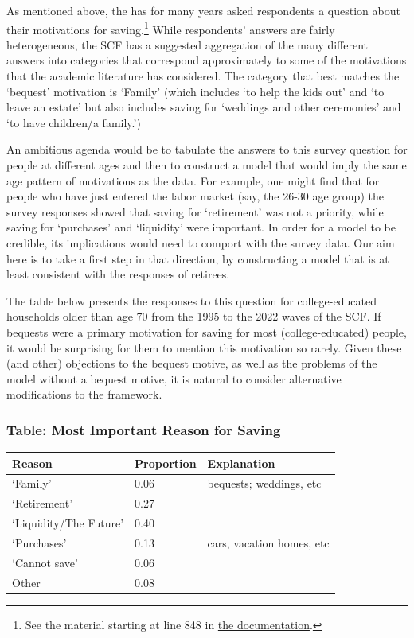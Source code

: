 \documentclass{article}
\begin{document}
As mentioned above, the \cite{2023} has for many years asked respondents a question about their motivations for saving.\footnote{See the material starting at line 848 in \href{https://www.federalreserve.gov/econres/files/bulletin.macro.txt}{the documentation}.}
While respondents' answers are fairly heterogeneous, the SCF has a suggested aggregation of the many different answers into categories that correspond approximately to some of the motivations that the academic literature has considered.
The category that best matches the `bequest' motivation is `Family' (which includes `to help the kids out' and `to leave an estate' but also includes saving for `weddings and other ceremonies' and `to have children/a family.')

An ambitious agenda would be to tabulate the answers to this survey question for people at different ages and then to construct a model that would imply the same age pattern of motivations as the data.
For example, one might find that for people who have just entered the labor market (say, the 26-30 age group) the survey responses showed that saving for `retirement' was not a priority, while saving for `purchases' and `liquidity' were important.
In order for a model to be credible, its implications would need to comport with the survey data.
Our aim here is to take a first step in that direction, by constructing a model that is at least consistent with the responses of retirees.

The table below presents the responses to this question for college-educated households older than age 70 from the 1995 to the 2022 waves of the SCF.
If bequests were a primary motivation for saving for most (college-educated) people, it would be surprising for them to mention this motivation so rarely.
Given these (and other) objections to the bequest motive, as well as the problems of the model without a bequest motive, it is natural to consider alternative modifications to the framework.

\subsubsection{Table: Most Important Reason for Saving}\label{most-important-reason}

\bigskip\noindent
\begin{tabular}{p{}p{}p{}}
\toprule
Reason & Proportion & Explanation \\
\hline
`Family' & 0.06 & bequests; weddings, etc \\
`Retirement' & 0.27 &  \\
`Liquidity/The Future' & 0.40 &  \\
`Purchases' & 0.13 & cars, vacation homes, etc \\
`Cannot save' & 0.06 &  \\
Other & 0.08 &  \\
\bottomrule
\end{tabular}
\end{document}
